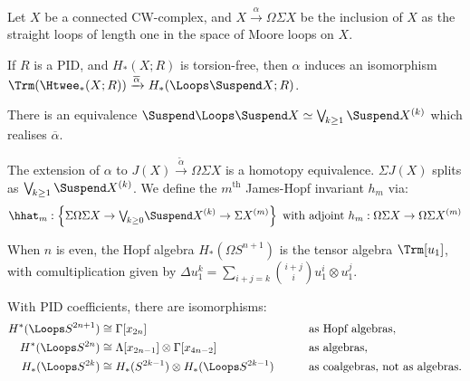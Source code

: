 \fi
\begin{SummaryNote}
Let $X$ be a connected CW-complex, and $X\xrightarrow{\alpha} \Omega\Sigma X$ be the inclusion of $X$ as the straight loops of length one in the space of Moore loops on $X$.

\Bullet If $R$ is a PID, and $H_*(X; R)$ is torsion-free, then $\alpha$ induces an isomorphism $\Trm (\Htwee_*(X; R)) \xrightarrow{\overline \alpha} H_*(\Loops \Suspend X; R)$.

\Bullet There is an equivalence
$\Suspend \Loops \Suspend X \simeq \bigvee_{\!k \ge 1} \Suspend X^{(k)}$ which realises $\overline\alpha$.

\Bullet The extension of $\alpha$ to $J(X)\xrightarrow{\tilde\alpha}\Omega\Sigma X$ is a homotopy equivalence. $\Sigma J(X)$ splits as $\bigvee_{\!k \ge 1} \Suspend X^{(k)}$. We define the $m^\text{th}$ James-Hopf invariant $h_m$ via:
\[\hhat_m:\left\{\Sigma\Omega\Sigma X\to{\textstyle\bigvee_{\!k \ge 0}} \Suspend X^{(k)}\to\Sigma X^{(m)}\right\}\text{ with adjoint }h_m:\Omega\Sigma X\to\Omega\Sigma X^{(m)}\]

\Bullet When $n$ is even, the Hopf algebra $H_*(\Omega S^{n+1})$ is the tensor algebra $\Trm[u_1]$, with comultiplication given by $\Delta u_1^k = {\displaystyle\sum_{i + j = k}} \binom{i+j}{i} u_1^i \otimes u_1 ^j$.

\Bullet With PID coefficients, there are isomorphisms:
\begin{alignat*}{2}
H^* (\Loops S^{2n+1}) & \cong \Gamma[x_{2n}]&\qquad&\text{as Hopf algebras}, \\
H^* (\Loops S^{2n}) & \cong \Lambda[x_{2n-1}] \otimes \Gamma[x_{4n-2}]&&\text{as algebras}, \\
H_* (\Loops S^{2k}) & \cong H_*( S^{2k-1}) \otimes H_* (\Loops S^{2k-1})&&\text{as coalgebras, not as algebras.}
\end{alignat*}
\end{SummaryNote}


